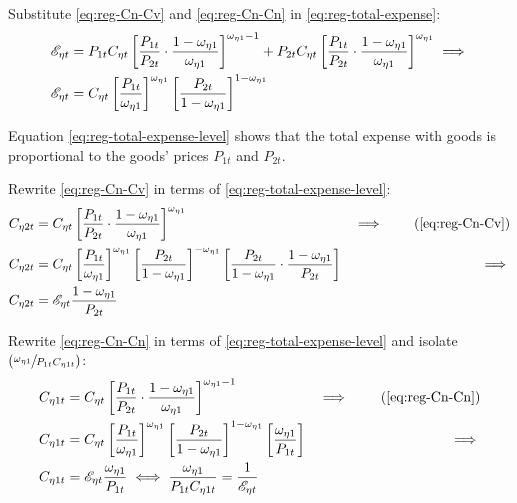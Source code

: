 \documentclass[../thesis.tex]{subfiles}
\begin{document}
Substitute \ref{eq:reg-Cn-Cv} and \ref{eq:reg-Cn-Cn} in \ref{eq:reg-total-expense}:
\begin{align}
	{\mathscr{E}_{\eta t}} &= P_{1 t} C_{\eta t} \left[ \frac{P_{1 t}}{P_{2 t}} \cdot \frac{1 -\omega_{\eta 1}}{\omega_{\eta 1}} \right]^{\omega_{\eta 1} -1} + P_{2 t} C_{\eta t} \left[ \frac{P_{1 t}}{P_{2 t}} \cdot \frac{1 -\omega_{\eta 1}}{\omega_{\eta 1}} \right]^{\omega_{\eta 1}} \implies \nonumber \\
	{\mathscr{E}_{\eta t}} &= C_{\eta t} \left[ \frac{P_{1 t}}{\omega_{\eta 1}} \right]^{\omega_{\eta 1}} \left[ \frac{P_{2 t}}{1 -\omega_{\eta 1}} \right]^{1 -\omega_{\eta 1}} \label{eq:reg-total-expense-level}
\end{align}

Equation \ref{eq:reg-total-expense-level} shows that the total expense with goods is proportional to the goods' prices $P_{1 t}$ and $P_{2 t}$.

Rewrite \ref{eq:reg-Cn-Cv} in terms of \ref{eq:reg-total-expense-level}:
\begin{alignat}{2}
	C_{\eta 2 t} &= C_{\eta t} \left[ \frac{P_{1 t}}{P_{2 t}} \cdot \frac{1 -\omega_{\eta 1}}{\omega_{\eta 1}} \right]^{\omega_{\eta 1}} &\implies \tag{\ref{eq:reg-Cn-Cv}} \\
	C_{\eta 2 t} &= C_{\eta t} \left[ \frac{P_{1 t}}{\omega_{\eta 1}} \right]^{\omega_{\eta 1}} \left[ \frac{P_{2 t}}{1 -\omega_{\eta 1}} \right]^{-\omega_{\eta 1}} \left[ \frac{P_{2 t}}{1 -\omega_{\eta 1}} \cdot \frac{1 -\omega_{\eta 1}}{P_{2 t}} \right] &\implies \nonumber \\
	C_{\eta 2 t} &= \te \frac{1 -\omega_{\eta 1}}{P_{2 t}} \label{eq:reg-Cn-Cv-2}
\end{alignat}

Rewrite \ref{eq:reg-Cn-Cn} in terms of \ref{eq:reg-total-expense-level} and isolate $(\sfrac{\omega_{\eta 1}}{P_{1 t} C_{\eta 1 t}})$:
	\begin{alignat}{2}
		C_{\eta 1 t} &= C_{\eta t} \left[ \frac{P_{1 t}}{P_{2 t}} \cdot \frac{1 -\omega_{\eta 1}}{\omega_{\eta 1}} \right]^{\omega_{\eta 1} -1} &\implies \tag{\ref{eq:reg-Cn-Cn}} \\
		C_{\eta 1 t} &= C_{\eta t} \left[ \frac{ P_{1 t}}{ \omega_{\eta 1}}\right]^{ \omega_{\eta 1}} \left[ \frac{P_{2 t}}{1-\omega_{\eta 1}} \right]^{1 -\omega_{\eta 1}} \left[ \frac{\omega_{\eta 1}}{P_{1 t}} \right] &\implies \nonumber \\
		C_{\eta 1 t} &= \te \frac{\omega_{\eta 1}}{P_{1 t}} \iff
		\frac{\omega_{\eta 1}}{P_{1 t} C_{\eta 1 t}} = \frac{1}{\te} \label{eq:reg-Cn-Cn-2}
	\end{alignat}
\end{document}
